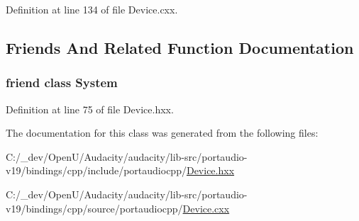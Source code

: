 Definition at line 134 of file Device.\+cxx.



\subsection{Friends And Related Function Documentation}
\subsubsection[{\texorpdfstring{System}{System}}]{\setlength{\rightskip}{0pt plus 5cm}friend class {\bf System}\hspace{0.3cm}{\ttfamily [friend]}}\hypertarget{classportaudio_1_1_device_af18a9ee98e70982bfe2975391d7221a5}{}\label{classportaudio_1_1_device_af18a9ee98e70982bfe2975391d7221a5}


Definition at line 75 of file Device.\+hxx.



The documentation for this class was generated from the following files\+:\begin{DoxyCompactItemize}
\item 
C\+:/\+\_\+dev/\+Open\+U/\+Audacity/audacity/lib-\/src/portaudio-\/v19/bindings/cpp/include/portaudiocpp/\hyperlink{_device_8hxx}{Device.\+hxx}\item 
C\+:/\+\_\+dev/\+Open\+U/\+Audacity/audacity/lib-\/src/portaudio-\/v19/bindings/cpp/source/portaudiocpp/\hyperlink{_device_8cxx}{Device.\+cxx}\end{DoxyCompactItemize}
